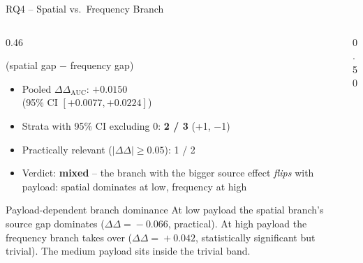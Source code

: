 \documentclass[aspectratio=169,11pt]{beamer}
\begin{document}
\begin{frame}{RQ4 -- Spatial vs.\ Frequency Branch}
\scriptsize
\begin{columns}[T]
\begin{column}{0.46\textwidth}
\begin{block}{(spatial gap $-$ frequency gap)}
\begin{itemize}\setlength{\itemsep}{1pt}
\item Pooled $\Delta\Delta_\text{AUC}$: $\boldsymbol{+0.0150}$ \\[1pt] (95\% CI $[+0.0077, +0.0224]$)
\item Strata with 95\% CI excluding 0: \textbf{2 / 3} (+1, $-$1)
\item Practically relevant ($|\Delta\Delta|\!\geq\!0.05$): 1 / 2
\item Verdict: \textbf{mixed} -- the branch with the bigger source effect \emph{flips} with payload: spatial dominates at low, frequency at high
\end{itemize}
\end{block}
\begin{exampleblock}{Payload-dependent branch dominance}
At low payload the spatial branch's source gap dominates ($\Delta\Delta\!=\!-0.066$, practical). At high payload the frequency branch takes over ($\Delta\Delta\!=\!+0.042$, statistically significant but trivial). The medium payload sits inside the trivial band.
\end{exampleblock}
\end{column}
\begin{column}{0.50\textwidth}
\begin{center}
\end{center}
\end{column}
\end{columns}
\end{frame}
\end{document}
